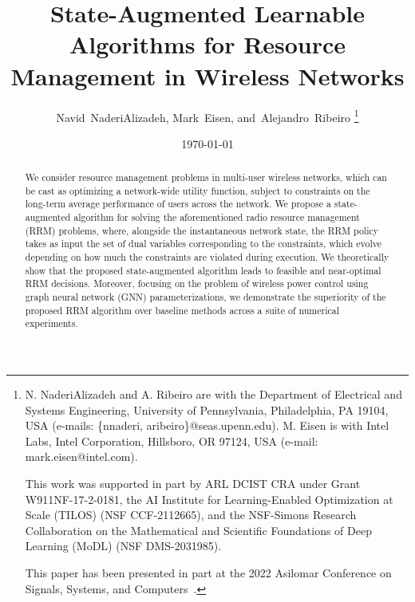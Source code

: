 \documentclass[lettersize,journal]{IEEEtran}
\date{\today}
\begin{document}
\title{State-Augmented Learnable Algorithms for Resource Management in Wireless Networks}

\author{}

\author{Navid~NaderiAlizadeh,
        Mark~Eisen,
        and~Alejandro~Ribeiro%
\thanks{N. NaderiAlizadeh and A. Ribeiro are with the Department of Electrical and Systems Engineering, University of Pennsylvania, Philadelphia,
PA 19104, USA (e-mails: \{nnaderi, aribeiro\}@seas.upenn.edu). M. Eisen is with Intel Labs, Intel Corporation, Hillsboro, OR 97124, USA (e-mail: mark.eisen@intel.com).

This work was supported in part by ARL DCIST CRA under Grant W911NF-17-2-0181, the AI Institute for Learning-Enabled Optimization at Scale (TILOS) (NSF CCF-2112665), and the NSF-Simons Research Collaboration on the Mathematical and Scientific Foundations of Deep Learning (MoDL) (NSF DMS-2031985).

This paper has been presented in part at the 2022 Asilomar Conference on Signals, Systems, and Computers~\cite{naderializadeh2022state}.}%
}



\maketitle

\begin{abstract}
We consider resource management problems in multi-user wireless networks, which can be cast as optimizing a network-wide utility function, subject to constraints on the long-term average performance of users across the network. We propose a state-augmented algorithm for solving the aforementioned radio resource management (RRM) problems, where, alongside the instantaneous network state, the RRM policy takes as input the set of dual variables corresponding to the constraints, which evolve depending on how much the constraints are violated during execution. We theoretically show that the proposed state-augmented algorithm leads to feasible and near-optimal RRM decisions. Moreover, focusing on the problem of wireless power control using graph neural network (GNN) parameterizations, we demonstrate the superiority of the proposed RRM algorithm over baseline methods across a suite of numerical experiments.
\end{abstract}
\end{document}
